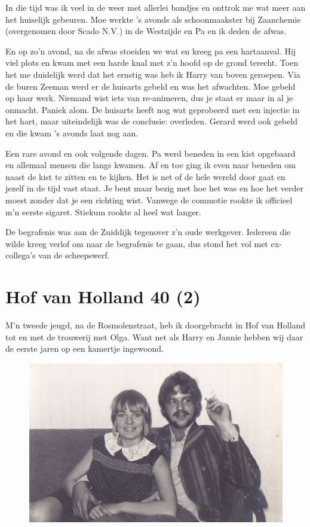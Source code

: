 \documentclass[10pt,twoside, openright]{memoir}
\begin{document}
In die tijd was ik veel in de weer met allerlei bandjes en onttrok me wat meer aan het huiselijk gebeuren. Moe werkte ’s avonds als schoonmaakster bij Zaanchemie (overgenomen door Scado N.V.) in de Westzijde en Pa en ik deden de afwas. 

En op zo’n avond, na de afwas stoeiden we wat en kreeg pa een hartaanval. Hij viel plots en kwam met een harde knal met z’n hoofd op de grond terecht. Toen het me duidelijk werd dat het ernstig was heb ik Harry van boven geroepen. Via de buren Zeeman werd er de huisarts gebeld en was het afwachten. Moe gebeld op haar werk. Niemand wist iets van re-animeren, dus je staat er maar in al je onmacht. Paniek alom. De huisarts heeft nog wat geprobeerd met een injectie in het hart, maar uiteindelijk was de conclusie: overleden. Gerard werd ook gebeld en die kwam ’s avonds laat nog aan. 

Een rare avond en ook volgende dagen. Pa werd beneden in een kist opgebaard en allemaal mensen die langs kwamen. Af en toe ging ik even naar beneden om naast de kist te zitten en te kijken. Het is net of de hele wereld door gaat en jezelf in de tijd vast staat. Je bent maar bezig met hoe het was en hoe het verder moest zonder dat je een richting wist. Vanwege de commotie rookte ik officieel m’n eerste sigaret. Stiekum rookte al heel wat langer.

De begrafenis was aan de Zuiddijk tegenover z’n oude werkgever. Iedereen die wilde kreeg verlof om naar de begrafenis te gaan, dus stond het vol met ex-collega’s van de scheepswerf. 

\section{Hof van Holland 40 (2)} %
\label{cha:hofvanholland2}

M’n tweede jeugd, na de Rosmolenstraat, heb ik doorgebracht in Hof van Holland tot en met de trouwerij met Olga. Want net als Harry en Jannie hebben wij daar de eerste jaren op een kamertje ingewoond.

\begin{figure}[h]
\includegraphics[width=\textwidth]{img/ch22/joho_0001}
\end{figure}
\end{document}
